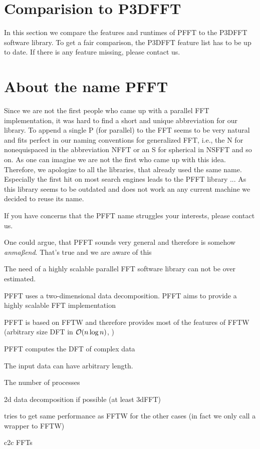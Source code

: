 \section{Comparision to P3DFFT}
In this section we compare the features and runtimes of PFFT to the P3DFFT software library.
To get a fair comparison, the P3DFFT feature list has to be up to date. If there is any feature missing, please contact us.

\section{About the name PFFT}
Since we are not the first people who came up with a parallel FFT implementation, it was hard
to find a short and unique abbreviation for our library. To append a single P (for parallel)
to the FFT seems to be very natural and fits perfect in our naming conventions for generalized
FFT, i.e., the N for nonequispaced in the abbreviation NFFT or an S for spherical in NSFFT and so on.
As one can imagine we are not the first who came up with this idea. Therefore, we apologize
to all the libraries, that already used the same name. Especially the first hit on most search engines
leads to the PFFT library ... As this library seems to be outdated and does not work an any current
machine we decided to reuse its name.

If you have concerns that the PFFT name struggles your interests, please contact us.


One could argue, that PFFT sounds very general and therefore is somehow \emph{anma\ss{}end}.
That's true and we are aware of this


The need of a highly scalable parallel FFT software library can not be over estimated. 

PFFT uses a two-dimensional data decomposition.
PFFT aims to provide a highly scalable FFT implementation

\begin{compactitem}
  \item PFFT is based on FFTW \cite{fftw} and therefore provides most of the features of FFTW
        (arbitrary size DFT in $\mathcal{O}(n \log n)$, )
  \item PFFT computes the DFT of complex data
  \item The input data can have arbitrary length.
  \item The number of processes 
\end{compactitem}


\begin{compactitem}
  \item 2d data decomposition if possible (at least 3dFFT)
  \item tries to get same performance as FFTW for the other cases (in fact we only call a wrapper to FFTW)
  \item c2c FFTs
\end{compactitem}

